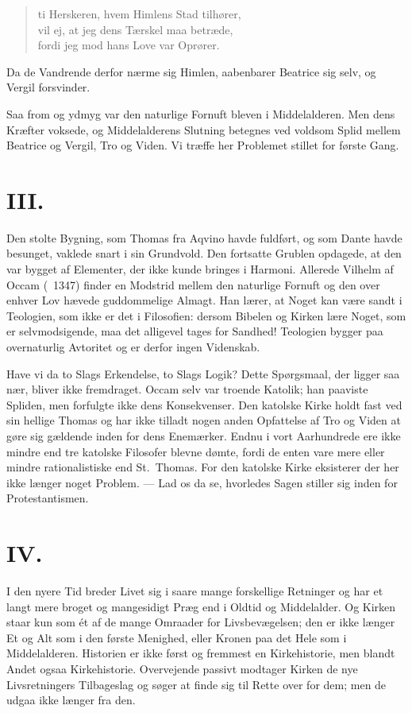 \documentclass[12pt,a4paper]{article}
\newcommand{\apage}[1]{\marginnote{\footnotesize\textit{[#1]}}}
\begin{document}
\begin{quote}
ti Herskeren, hvem Himlens Stad tilhører,\\
vil ej, at jeg dens Tærskel maa betræde,\\
fordi jeg mod hans Love var Oprører.
\end{quote}

Da de Vandrende derfor nærme \apage{198} sig Himlen, aabenbarer Beatrice sig selv, og
Vergil forsvinder.

Saa from og ydmyg var den naturlige Fornuft bleven i Middelalderen. Men
dens Kræfter voksede, og Middelalderens Slutning betegnes ved voldsom Splid
mellem Beatrice og Vergil, Tro og Viden. Vi træffe her Problemet stillet
for første Gang.

\section*{III.}

Den stolte Bygning, som Thomas fra Aqvino havde fuldført, og som Dante
havde besunget, vaklede snart i sin Grundvold. Den fortsatte Grublen
opdagede, at den var bygget af Elementer, der ikke kunde bringes i Harmoni.
Allerede Vilhelm af Occam (\dag\ 1347) finder en Modstrid mellem den
naturlige Fornuft og den over enhver Lov hævede guddommelige Almagt. Han
lærer, at Noget kan være sandt i Teologien, som ikke er det i Filosofien:
dersom Bibelen og Kirken lære Noget, som er selvmodsigende, maa det
alligevel tages for Sandhed! Teologien bygger paa overnaturlig Avtoritet og
er derfor ingen Videnskab.

Have vi da to Slags Erkendelse, to Slags Logik? Dette Spørgsmaal, der
ligger saa nær, bliver ikke fremdraget. Occam selv var troende Katolik; han
paaviste Spliden, men forfulgte ikke dens Konsekvenser. Den katolske Kirke
holdt fast ved sin hellige Thomas og har ikke tilladt nogen anden Opfattelse
af Tro og Viden at gøre sig gældende inden for dens Enemærker. Endnu i vort
Aarhundrede ere ikke mindre end tre katolske Filosofer blevne dømte, fordi
de enten vare mere eller mindre rationalistiske end St.\ Thomas. For den
katolske Kirke eksisterer der her ikke længer noget Problem. --- Lad os da
se, hvorledes Sagen stiller sig inden for Protestantismen.

\section*{IV.}

I den nyere Tid breder Livet sig i saare mange forskellige Retninger og har
et langt mere broget og mangesidigt Præg end i Oldtid og Middelalder. Og
Kirken \apage{199} staar kun som ét af de mange Omraader for Livsbevægelsen; den er
ikke længer Et og Alt som i den første Menighed, eller Kronen paa det Hele
som i Middelalderen. Historien er ikke først og fremmest en Kirkehistorie,
men blandt Andet ogsaa Kirkehistorie. Overvejende passivt modtager Kirken
de nye Livsretningers Tilbageslag og søger at finde sig til Rette over for
dem; men de udgaa ikke længer fra den.
\end{document}
